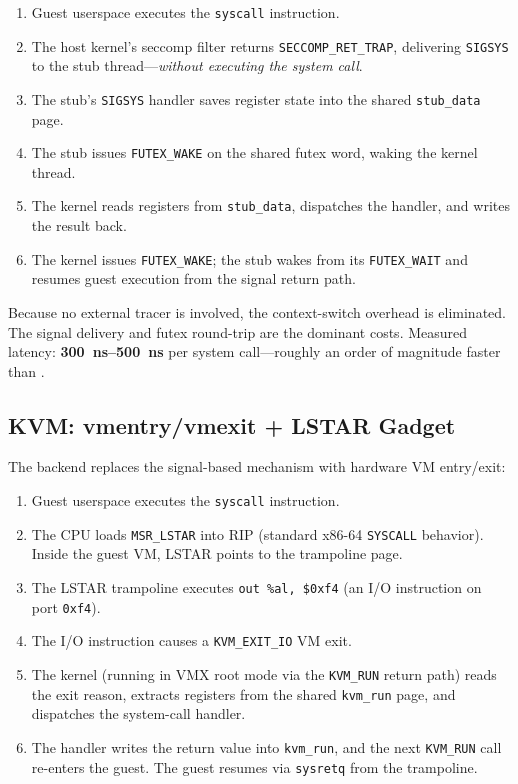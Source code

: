 \begin{enumerate}
  \item Guest userspace executes the \texttt{syscall} instruction.
  \item The host kernel's seccomp filter returns
        \texttt{SECCOMP\_RET\_TRAP}, delivering \texttt{SIGSYS} to
        the stub thread---\emph{without executing the system call}.
  \item The stub's \texttt{SIGSYS} handler saves register state into
        the shared \texttt{stub\_data} page.
  \item The stub issues \texttt{FUTEX\_WAKE} on the shared futex word,
        waking the \UML{} kernel thread.
  \item The \UML{} kernel reads registers from \texttt{stub\_data},
        dispatches the handler, and writes the result back.
  \item The \UML{} kernel issues \texttt{FUTEX\_WAKE}; the stub wakes
        from its \texttt{FUTEX\_WAIT} and resumes guest execution from
        the signal return path.
\end{enumerate}

Because no external tracer is involved, the context-switch overhead is
eliminated.  The signal delivery and futex round-trip are the dominant
costs.  Measured latency: \textbf{\SIrange{300}{500}{\nano\second}}
per system call---roughly an order of magnitude faster than .

\subsection{KVM: vmentry/vmexit + LSTAR Gadget}

The \KVM{} backend replaces the signal-based mechanism with hardware
VM entry/exit:

\begin{enumerate}
  \item Guest userspace executes the \texttt{syscall} instruction.
  \item The CPU loads \texttt{MSR\_LSTAR} into RIP (standard x86-64
        \texttt{SYSCALL} behavior).  Inside the guest VM, LSTAR points
        to the \UML{} trampoline page.
  \item The LSTAR trampoline executes \texttt{out \%al, \$0xf4}
        (an I/O instruction on port \texttt{0xf4}).
  \item The I/O instruction causes a \texttt{KVM\_EXIT\_IO} VM exit.
  \item The \UML{} kernel (running in VMX root mode via the
        \texttt{KVM\_RUN} return path) reads the exit reason, extracts
        registers from the shared \texttt{kvm\_run} page, and dispatches
        the system-call handler.
  \item The handler writes the return value into \texttt{kvm\_run},
        and the next \texttt{KVM\_RUN} call re-enters the guest.
        The guest resumes via \texttt{sysretq} from the trampoline.
\end{enumerate}

